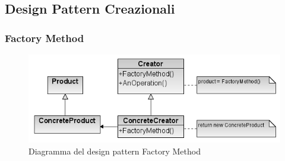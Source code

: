 \subsection{Design Pattern Creazionali}

\subsubsection{Factory Method}

\begin{figure}[h]
\begin{center}
\includegraphics[scale=0.4]{img/Factory.png}
\caption{Diagramma del design pattern Factory Method}
\end{center}
\end{figure}

